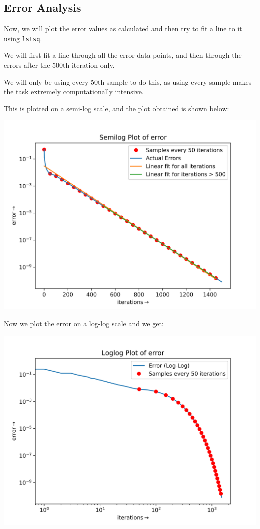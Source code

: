 \documentclass[12pt]{article}
\begin{document}
\subsection{Error Analysis}
Now, we will plot the error values as calculated and then try to fit a line to it using \texttt{lstsq}.

We will first fit a line through all the error data points, and then through the errors after the 500th iteration only.

We will only be using every 50th sample to do this, as using every sample makes the task extremely computationally intensive.

This is plotted on a semi-log scale, and the plot obtained is shown below:
\begin{center}
    \includegraphics[scale=0.8]{images/fig2.png}
\end{center}
\pagebreak
Now we plot the error on a log-log scale and we get:
\begin{center}
    \includegraphics[scale=0.8]{images/fig3.png}
\end{center}
\end{document}
